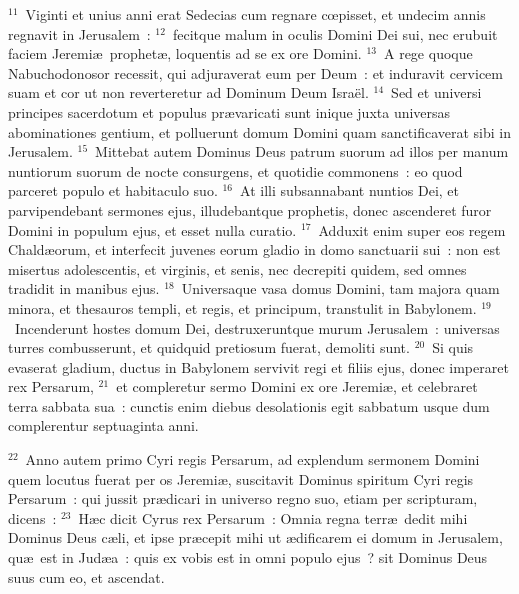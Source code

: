 ${}^{11}$~Viginti et unius anni erat Sedecias cum regnare cœpisset, et undecim annis regnavit in Jerusalem~:
${}^{12}$~fecitque malum in oculis Domini Dei sui, nec erubuit faciem Jeremi\ae\ prophet\ae , loquentis ad se ex ore Domini.
${}^{13}$~A rege quoque Nabuchodonosor recessit, qui adjuraverat eum per Deum~: et induravit cervicem suam et cor ut non reverteretur ad Dominum Deum Isra\"el.
${}^{14}$~Sed et universi principes sacerdotum et populus pr\ae varicati sunt inique juxta universas abominationes gentium, et polluerunt domum Domini quam sanctificaverat sibi in Jerusalem.
${}^{15}$~Mittebat autem Dominus Deus patrum suorum ad illos per manum nuntiorum suorum de nocte consurgens, et quotidie commonens~: eo quod parceret populo et habitaculo suo.
${}^{16}$~At illi subsannabant nuntios Dei, et parvipendebant sermones ejus, illudebantque prophetis, donec ascenderet furor Domini in populum ejus, et esset nulla curatio.
${}^{17}$~Adduxit enim super eos regem Chald\ae orum, et interfecit juvenes eorum gladio in domo sanctuarii sui~: non est misertus adolescentis, et virginis, et senis, nec decrepiti quidem, sed omnes tradidit in manibus ejus.
${}^{18}$~Universaque vasa domus Domini, tam majora quam minora, et thesauros templi, et regis, et principum, transtulit in Babylonem.
${}^{19}$~Incenderunt hostes domum Dei, destruxeruntque murum Jerusalem~: universas turres combusserunt, et quidquid pretiosum fuerat, demoliti sunt.
${}^{20}$~Si quis evaserat gladium, ductus in Babylonem servivit regi et filiis ejus, donec imperaret rex Persarum,
${}^{21}$~et compleretur sermo Domini ex ore Jeremi\ae , et celebraret terra sabbata sua~: cunctis enim diebus desolationis egit sabbatum usque dum complerentur septuaginta anni.


${}^{22}$~Anno autem primo Cyri regis Persarum, ad explendum sermonem Domini quem locutus fuerat per os Jeremi\ae , suscitavit Dominus spiritum Cyri regis Persarum~: qui jussit pr\ae dicari in universo regno suo, etiam per scripturam, dicens~:
${}^{23}$~H\ae c dicit Cyrus rex Persarum~: Omnia regna terr\ae\ dedit mihi Dominus Deus c\ae li, et ipse pr\ae cepit mihi ut \ae dificarem ei domum in Jerusalem, qu\ae\ est in Jud\ae a~: quis ex vobis est in omni populo ejus~? sit Dominus Deus suus cum eo, et ascendat.
